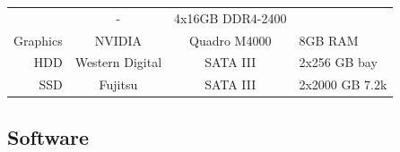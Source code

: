 \documentclass[11pt,singlespacinge,twoside]{reedthesis} %
\begin{document}
\begin{longtable}[]{@{}rccl@{}}
\begin{minipage}[t]{0.20\columnwidth}
\end{minipage} & \begin{minipage}[t]{0.22\columnwidth}\centering
-\strut
\end{minipage} & \begin{minipage}[t]{0.28\columnwidth}\raggedright
4x16GB DDR4-2400\strut
\end{minipage}\tabularnewline
\begin{minipage}[t]{0.19\columnwidth}\raggedleft
Graphics\strut
\end{minipage} & \begin{minipage}[t]{0.20\columnwidth}\centering
NVIDIA\strut
\end{minipage} & \begin{minipage}[t]{0.22\columnwidth}\centering
Quadro M4000\strut
\end{minipage} & \begin{minipage}[t]{0.28\columnwidth}\raggedright
8GB RAM\strut
\end{minipage}\tabularnewline
\begin{minipage}[t]{0.19\columnwidth}\raggedleft
HDD\strut
\end{minipage} & \begin{minipage}[t]{0.20\columnwidth}\centering
Western Digital\strut
\end{minipage} & \begin{minipage}[t]{0.22\columnwidth}\centering
SATA III\strut
\end{minipage} & \begin{minipage}[t]{0.28\columnwidth}\raggedright
2x256 GB bay\strut
\end{minipage}\tabularnewline
\begin{minipage}[t]{0.19\columnwidth}\raggedleft
SSD\strut
\end{minipage} & \begin{minipage}[t]{0.20\columnwidth}\centering
Fujitsu\strut
\end{minipage} & \begin{minipage}[t]{0.22\columnwidth}\centering
SATA III\strut
\end{minipage} & \begin{minipage}[t]{0.28\columnwidth}\raggedright
2x2000 GB 7.2k\strut
\end{minipage}\tabularnewline
\bottomrule
\end{longtable}
\hypertarget{mat-sftwr}{%
\subsection{Software}\label{mat-sftwr}}
\end{document}
